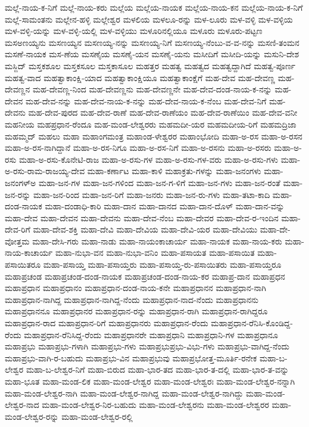 {ಮಲ್ಲೆ-ನಾಯ-ಕ-ನಿಗೆ
ಮಲ್ಲೆ-ನಾಯ-ಕರು
ಮಲ್ಲೆಯ
ಮಲ್ಲೆಯ-ನಾಯಕ
ಮಲ್ಲೆಯ-ನಾಯ-ಕನ
ಮಲ್ಲೆಯ-ನಾಯ-ಕ-ನಿಗೆ
ಮಲ್ಲೆ-ಸಾಮಂತನು
ಮಲ್ಲೇನ-ಹಳ್ಳಿ
ಮಲ್ಲೇಶ್ವರ
ಮಳಲಿಯ
ಮಳಲೂ-ರನ್ನು
ಮಳ-ಲೂರು
ಮಳ-ವಳ್ಳಿ
ಮಳ-ವಳ್ಳಿಯ
ಮಳ-ವಳ್ಳಿ-ಯನ್ನು
ಮಳ-ವಳ್ಳಿ-ಯಲ್ಲಿ
ಮಳ-ವಳ್ಳಿಯು
ಮಳೂರಿನಲ್ಲಿಯೂ
ಮಳೂರು
ಮಳೂರು-ಪಟ್ಟಣ
ಮಸಅಣಯ್ಯನು
ಮಸಣಯ್ಯನ
ಮಸಣಯ್ಯ-ನನ್ನು
ಮಸಣಯ್ಯ-ನಿಗೆ
ಮಸಣಯ್ಯ-ನೆಂಬು-ವ-ವ-ನನ್ನು
ಮಸಣಿ-ತಂಮನ
ಮಸಣೆ-ನಾಯಕ
ಮಸ-ಣೆಯ
ಮಸಣೈಯ
ಮಸಣೈ-ಯನ
ಮಸಣೈ-ಯನು
ಮಸೀದಿಗೆ
ಮಸೀದಿ-ಯನ್ನು
ಮಸುನಿ-ದೇಶ
ಮಸ್ಜಿದ್
ಮಸ್ತಕಶೂಲ
ಮಸ್ತಕಸೂಲ
ಮಸ್ತಕಾಸೂಲ
ಮಹತ್ತರ
ಮಹತ್ವ
ಮಹತ್ವದ
ಮಹತ್ವದ್ದಾಗಿದೆ
ಮಹತ್ವ-ಪೂರ್ಣ
ಮಹತ್ವ-ವಾದ
ಮಹತ್ವಾಕಾಂಕ್ಷಿ-ಯಾದ
ಮಹತ್ವಾಕಾಂಕ್ಷಿಯೂ
ಮಹತ್ವಾಕಾಂಕ್ಷೆಗೆ
ಮಹ-ದೇವ
ಮಹ-ದೇವಣ್ಣ
ಮಹ-ದೇವಣ್ಣನ
ಮಹ-ದೇವಣ್ಣ-ನಿಂದ
ಮಹ-ದೇವಣ್ಣನು
ಮಹ-ದೇವಣ್ಣನೇ
ಮಹ-ದೇವ-ದಂಡ-ನಾಯ-ಕ-ನನ್ನು
ಮಹ-ದೇವನ
ಮಹ-ದೇವ-ನನ್ನು
ಮಹ-ದೇವ-ನಾಯ-ಕ-ನನ್ನು
ಮಹ-ದೇವ-ನಾಯ-ಕ-ನೆಂಬ
ಮಹ-ದೇವ-ನಿಗೆ
ಮಹ-ದೇವನು
ಮಹ-ದೇವ-ಪುರದ
ಮಹ-ದೇವ-ರಾಣೆ
ಮಹ-ದೇವ-ರಾಣೆಯಂ
ಮಹ-ದೇವ-ರಾಣೆಯಿಂ
ಮಹ-ದೇವ-ವನೀ
ಮಹನೀಯ
ಮಹಪ್ರಧಾನ-ರೆಂದೂ
ಮಹ-ಮಂಡ-ಲೇಶ್ವರರು
ಮಹಮದೀ-ಯರ
ಮಹಮದೀಯ-ರಿಗೆ
ಮಹಮದ್ರಿಜಾ
ಮಹಮ್ಮದ್
ಮಹಲು
ಮಹಾ
ಮಹಾಂಗಮಂತ್ರ
ಮಹಾಂಡ-ಳೇಶ್ವರರ
ಮಹಾಂಭೋದಿ
ಮಹಾ-ಅ-ರಸ
ಮಹಾ-ಅ-ರಸನ
ಮಹಾ-ಅ-ರಸ-ನಾಗಿದ್ದಾನೆ
ಮಹಾ-ಅ-ರಸ-ನಿಗೂ
ಮಹಾ-ಅ-ರಸ-ನಿಗೆ
ಮಹಾ-ಅ-ರಸನು
ಮಹಾ-ಅ-ರಸರು
ಮಹಾ-ಅ-ರಸು
ಮಹಾ-ಅ-ರಸು-ಕೊನೇಟಿ-ರಾಜ
ಮಹಾ-ಅ-ರಸು-ಗಳ
ಮಹಾ-ಅ-ರಸು-ಗಳ-ವರು
ಮಹಾ-ಅ-ರಸು-ಗಳು
ಮಹಾ-ಅ-ರಸು-ರಾಮ-ರಾಜಯ್ಯ-ದೇವ
ಮಹಾ-ಕರ್ಣಾಟ
ಮಹಾ-ಕಾಳಿ
ಮಹಾಕ್ರತು-ಗಳನ್ನು
ಮಹಾ-ಜನಂಗಳು
ಮಹಾ-ಜನಂಗಳ್ಅ
ಮಹಾ-ಜನ-ಗಳ
ಮಹಾ-ಜನ-ಗಳಿಂದ
ಮಹಾ-ಜನ-ಗ-ಳಿಗೆ
ಮಹಾ-ಜನ-ಗಳು
ಮಹಾ-ಜನ-ರಂತೆ
ಮಹಾ-ಜನ-ರನ್ನು
ಮಹಾ-ಜನ-ರಿಂದ
ಮಹಾ-ಜನ-ರಿಗೆ
ಮಹಾ-ಜನರು
ಮಹಾ-ಜನ-ರು-ಗಳು
ಮಹಾ-ತಟಾ-ಕಾದಿ
ಮಹಾ-ದಂಡ-ನಾಯಕ
ಮಹಾ-ದಂಡಾಧಿ-ಕಾರಿ
ಮಹಾ-ದಾನ
ಮಹಾ-ದಾನದ
ಮಹಾ-ದಾನ-ದೊಳ್
ಮಹಾ-ದಾನ-ವನ್ನು
ಮಹಾ-ದೇವ
ಮಹಾ-ದೇವನ
ಮಹಾ-ದೇವನು
ಮಹಾ-ದೇವ-ನೆಂಬ
ಮಹಾ-ದೇವರ
ಮಹಾ-ದೇವ-ರ-ಇಂದಿನ
ಮಹಾ-ದೇವ-ರಿಗೆ
ಮಹಾ-ದೇವ-ಶಕ್ತಿ
ಮಹಾ-ದೇವಿ
ಮಹಾ-ದೇವಿಯ
ಮಹಾ-ದೇವಿ-ಯರ
ಮಹಾ-ದೇವಿಯು
ಮಹಾ-ದೇ-ವೋತ್ತಮ
ಮಹಾ-ದೇಸಿ-ಗರು
ಮಹಾ-ನಾಡು
ಮಹಾ-ನಾಯಂಕಾಚಾರ್ಯ
ಮಹಾ-ನಾಯಕ
ಮಹಾ-ನಾಯ-ಕರು
ಮಹಾ-ನಾಯ-ಕಾಚಾರ್ಯ
ಮಹಾ-ನುಭಾ-ವನ
ಮಹಾ-ನುಭಾ-ವನಿಂ
ಮಹಾ-ಪಸಾಯತ
ಮಹಾ-ಪಸಾಯಿತ
ಮಹಾ-ಪಸಾಯಿತರೂ
ಮಹಾ-ಪಸಾಯ್ತ
ಮಹಾ-ಪಸಾಯ್ತರು
ಮಹಾ-ಪಸಾಯ್ತ-ರು-ಪಸಾಯಿತರು
ಮಹಾ-ಪಸಾಯ್ತರೂ
ಮಹಾಪ್ರಚಂಡ
ಮಹಾಪ್ರಚಂಡ-ದಂಡ-ನಾಯಕ
ಮಹಾಪ್ರಚಂಡ-ದಂಡ-ನಾಯ-ಕರ
ಮಹಾಪ್ರ-ದಾನ
ಮಹಾಪ್ರಧನ
ಮಹಾಪ್ರಧಾನ
ಮಹಾಪ್ರಧಾನಂ
ಮಹಾಪ್ರಧಾನ-ದಂಡ-ನಾಯ-ಕನೇ
ಮಹಾಪ್ರಧಾನನ
ಮಹಾಪ್ರಧಾನ-ನಾಗಿ
ಮಹಾಪ್ರಧಾನ-ನಾಗಿದ್ದ
ಮಹಾಪ್ರಧಾನ-ನಾಗಿದ್ದ-ನೆಂದು
ಮಹಾಪ್ರಧಾನ-ನಾದ-ನೆಂದು
ಮಹಾಪ್ರಧಾನನು
ಮಹಾಪ್ರಧಾನನೂ
ಮಹಾಪ್ರಧಾನರ
ಮಹಾಪ್ರಧಾನ-ರನ್ನು
ಮಹಾಪ್ರಧಾನ-ರಾಗಿ
ಮಹಾಪ್ರಧಾನ-ರಾಗಿದ್ದರೂ
ಮಹಾಪ್ರಧಾನ-ರಾದ
ಮಹಾಪ್ರಧಾನ-ರಿಗೆ
ಮಹಾಪ್ರಧಾನರು
ಮಹಾಪ್ರಧಾನ-ರೆಂದು
ಮಹಾಪ್ರಧಾನ-ರೆನಿಸಿ-ಕೊಂಡಿದ್ದ-ರೆಂದು
ಮಹಾಪ್ರಧಾನ-ರೆನಿಸಿದ್ದ-ರೆಂದು
ಮಹಾಪ್ರಧಾನರೇ
ಮಹಾಪ್ರಧಾನಿ
ಮಹಾಪ್ರಧಾನಿ-ಗಳ
ಮಹಾಪ್ರಧಾನೂ
ಮಹಾಪ್ರಭು
ಮಹಾಪ್ರಭು-ಗಳಾಗಿ
ಮಹಾಪ್ರಭು-ಗಳು
ಮಹಾಪ್ರಭುಪ್ರಭು-ವಿಭು-ಗಳು
ಮಹಾಪ್ರಭು-ವಾಗಿದ್ದ-ನೆಂದು
ಮಹಾಪ್ರಭು-ವಾಗಿ-ರ-ಬಹುದು
ಮಹಾಪ್ರಭು-ವಿನ
ಮಹಾಪ್ರಭುವು
ಮಹಾಪ್ರಭೋತ್ತ-ಮೂರ್ತಿ-ರನೇಕ
ಮಹಾ-ಬ-ಲೇಶ್ವರ
ಮಹಾ-ಬ-ಲೇಶ್ವರ-ನಿಗೆ
ಮಹಾ-ಬಿರುದ
ಮಹಾ-ಭಾರ-ತದ
ಮಹಾ-ಭಾರ-ತ-ದಲ್ಲಿ
ಮಹಾ-ಭಾರ-ತ-ವನ್ನು
ಮಹಾ-ಭೂತ
ಮಹಾ-ಮಂಡ-ಲಿಕ
ಮಹಾ-ಮಂಡ-ಲೇಶ್ವರ
ಮಹಾ-ಮಂಡ-ಲೇಶ್ವರಃ
ಮಹಾ-ಮಂಡ-ಲೇಶ್ವರ-ನನ್ನಾಗಿ
ಮಹಾ-ಮಂಡ-ಲೇಶ್ವರ-ನಾಗಿ
ಮಹಾ-ಮಂಡ-ಲೇಶ್ವರ-ನಾಗಿದ್ದ
ಮಹಾ-ಮಂಡ-ಲೇಶ್ವರ-ನಾಗಿದ್ದು
ಮಹಾ-ಮಂಡ-ಲೇಶ್ವರ-ನಾದ
ಮಹಾ-ಮಂಡ-ಲೇಶ್ವರ-ನಿರ-ಬಹುದು
ಮಹಾ-ಮಂಡ-ಲೇಶ್ವರನು
ಮಹಾ-ಮಂಡ-ಲೇಶ್ವರರ
ಮಹಾ-ಮಂಡ-ಲೇಶ್ವರ-ರನ್ನು
ಮಹಾ-ಮಂಡ-ಲೇಶ್ವರ-ರಲ್ಲಿ
}
